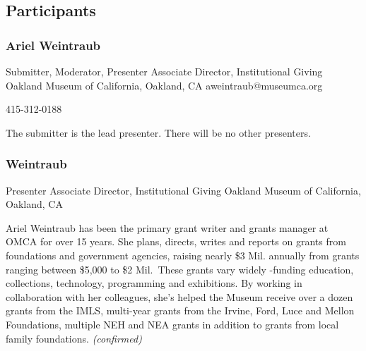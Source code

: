 \documentclass{report}
\begin{document}
            \subsection*{Participants}
              \subsubsection*{ Ariel Weintraub }
              Submitter, Moderator, Presenter\newline
              Associate Director, Institutional Giving\newline
              Oakland Museum of California, Oakland, CA
              \newline
              aweintraub@museumca.org\newline
              
              415-312-0188\newline

              The submitter is the lead presenter. There will be no other presenters.\newline


              

              
                \subsubsection*{  Weintraub }
                Presenter\newline
                Associate Director, Institutional Giving\newline
                Oakland Museum of California, Oakland, CA
                \newline
                
                
                

                Ariel Weintraub has been the primary grant writer and grants manager at OMCA for over 15 years. She plans, directs, writes and reports on grants from foundations and government agencies, raising nearly \$3 Mil. annually from grants ranging between \$5,000 to \$2 Mil. These grants vary widely -funding education, collections, technology, programming and exhibitions. By working in collaboration with her colleagues, she’s helped the Museum receive over a dozen grants from the IMLS, multi-year grants from the Irvine, Ford, Luce and Mellon Foundations, multiple NEH and NEA grants in addition to grants from local family foundations.
                \emph{ (confirmed) }
              
\end{document}
